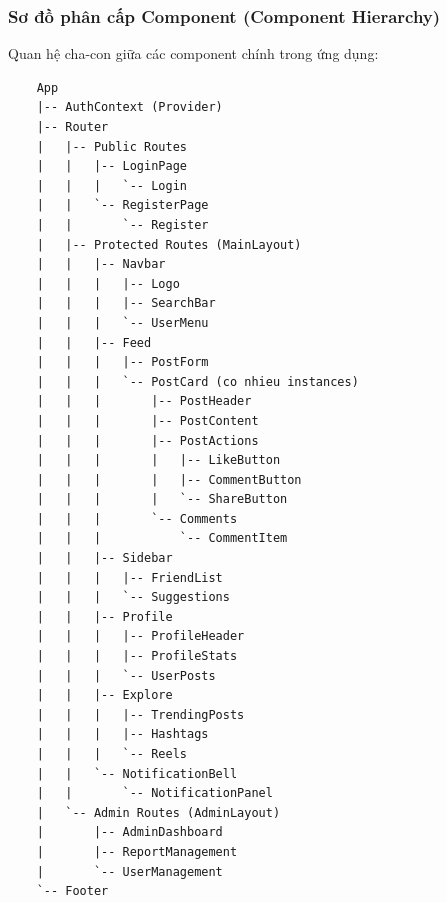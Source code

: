 \documentclass[a4paper]{article}
\begin{document}
    \subsubsection{Sơ đồ phân cấp Component (Component Hierarchy)}
    Quan hệ cha-con giữa các component chính trong ứng dụng:
    \begin{verbatim}
    App
    |-- AuthContext (Provider)
    |-- Router
    |   |-- Public Routes
    |   |   |-- LoginPage
    |   |   |   `-- Login
    |   |   `-- RegisterPage
    |   |       `-- Register
    |   |-- Protected Routes (MainLayout)
    |   |   |-- Navbar
    |   |   |   |-- Logo
    |   |   |   |-- SearchBar
    |   |   |   `-- UserMenu
    |   |   |-- Feed
    |   |   |   |-- PostForm
    |   |   |   `-- PostCard (co nhieu instances)
    |   |   |       |-- PostHeader
    |   |   |       |-- PostContent
    |   |   |       |-- PostActions
    |   |   |       |   |-- LikeButton
    |   |   |       |   |-- CommentButton
    |   |   |       |   `-- ShareButton
    |   |   |       `-- Comments
    |   |   |           `-- CommentItem
    |   |   |-- Sidebar
    |   |   |   |-- FriendList
    |   |   |   `-- Suggestions
    |   |   |-- Profile
    |   |   |   |-- ProfileHeader
    |   |   |   |-- ProfileStats
    |   |   |   `-- UserPosts
    |   |   |-- Explore
    |   |   |   |-- TrendingPosts
    |   |   |   |-- Hashtags
    |   |   |   `-- Reels
    |   |   `-- NotificationBell
    |   |       `-- NotificationPanel
    |   `-- Admin Routes (AdminLayout)
    |       |-- AdminDashboard
    |       |-- ReportManagement
    |       `-- UserManagement
    `-- Footer
    \end{verbatim}
\end{document}
